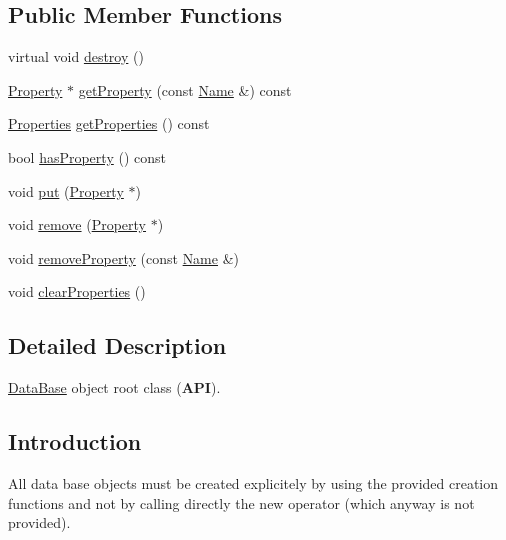 \subsection*{Public Member Functions}
\begin{DoxyCompactItemize}
\item 
virtual void \mbox{\hyperlink{classHurricane_1_1DBo_a67febf5bf9c8b322674648688639728b}{destroy}} ()
\item 
\mbox{\hyperlink{classHurricane_1_1Property}{Property}} $\ast$ \mbox{\hyperlink{classHurricane_1_1DBo_a599f61978df51d1d4c351f6cbd02488d}{get\+Property}} (const \mbox{\hyperlink{classHurricane_1_1Name}{Name}} \&) const
\item 
\mbox{\hyperlink{namespaceHurricane_afd7bca6dad4be54b7c03b0463e6c0004}{Properties}} \mbox{\hyperlink{classHurricane_1_1DBo_aec46894a10e83abb54c495dc4d90f2d3}{get\+Properties}} () const
\item 
bool \mbox{\hyperlink{classHurricane_1_1DBo_a1563f094565030c77592ed82f9a9989b}{has\+Property}} () const
\item 
void \mbox{\hyperlink{classHurricane_1_1DBo_a8979674f11507cb4c7c5251b41ed72d5}{put}} (\mbox{\hyperlink{classHurricane_1_1Property}{Property}} $\ast$)
\item 
void \mbox{\hyperlink{classHurricane_1_1DBo_a7833a1f0b8c704930bdc00861e63cf5e}{remove}} (\mbox{\hyperlink{classHurricane_1_1Property}{Property}} $\ast$)
\item 
void \mbox{\hyperlink{classHurricane_1_1DBo_ac35fbb8303b1a78db5ca0fc831fb6a0c}{remove\+Property}} (const \mbox{\hyperlink{classHurricane_1_1Name}{Name}} \&)
\item 
void \mbox{\hyperlink{classHurricane_1_1DBo_a3e02f3d665cb0b2120df2fdfe9c3df4f}{clear\+Properties}} ()
\end{DoxyCompactItemize}


\subsection{Detailed Description}
\mbox{\hyperlink{classHurricane_1_1DataBase}{Data\+Base}} object root class ({\bfseries A\+PI}). 

\hypertarget{classHurricane_1_1DBo_sDBoIntro}{}\subsection{Introduction}\label{classHurricane_1_1DBo_sDBoIntro}
All data base objects must be created explicitely by using the provided creation functions and not by calling directly the new operator (which anyway is not provided).


